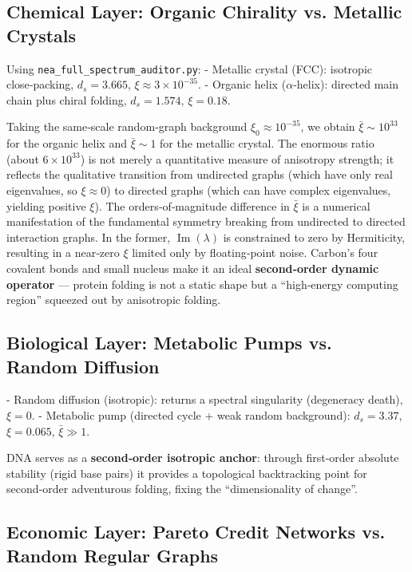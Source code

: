 \documentclass[12pt,a4paper]{article}
\begin{document}
\subsection{Chemical Layer: Organic Chirality vs. Metallic Crystals}

Using \texttt{nea\_full\_spectrum\_auditor.py}:
- Metallic crystal (FCC): isotropic close‑packing, $d_s=3.665$, $\xi\approx3\times10^{-35}$.
- Organic helix ($\alpha$‑helix): directed main chain plus chiral folding, $d_s=1.574$, $\xi=0.18$.

Taking the same‑scale random‑graph background $\xi_0\approx10^{-35}$, we obtain $\bar{\xi}\sim10^{33}$ for the organic helix and $\bar{\xi}\sim1$ for the metallic crystal. The enormous ratio (about $6\times10^{33}$) is not merely a quantitative measure of anisotropy strength; it reflects the qualitative transition from undirected graphs (which have only real eigenvalues, so $\xi\approx0$) to directed graphs (which can have complex eigenvalues, yielding positive $\xi$). The orders‑of‑magnitude difference in $\bar{\xi}$ is a numerical manifestation of the fundamental symmetry breaking from undirected to directed interaction graphs. In the former, $\operatorname{Im}(\lambda)$ is constrained to zero by Hermiticity, resulting in a near‑zero $\xi$ limited only by floating‑point noise. Carbon's four covalent bonds and small nucleus make it an ideal \textbf{second‑order dynamic operator} — protein folding is not a static shape but a “high‑energy computing region” squeezed out by anisotropic folding.

\subsection{Biological Layer: Metabolic Pumps vs. Random Diffusion}

- Random diffusion (isotropic): returns a spectral singularity (degeneracy death), $\xi=0$.
- Metabolic pump (directed cycle + weak random background): $d_s=3.37$, $\xi=0.065$, $\bar{\xi}\gg1$.

DNA serves as a \textbf{second‑order isotropic anchor}: through first‑order absolute stability (rigid base pairs) it provides a topological backtracking point for second‑order adventurous folding, fixing the “dimensionality of change”.

\subsection{Economic Layer: Pareto Credit Networks vs. Random Regular Graphs}
\end{document}
